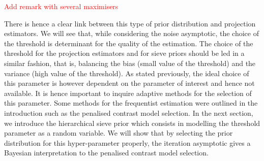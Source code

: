 \textcolor{red}{Add remark with several maximisers}

There is hence a clear link between this type of prior distribution and projection estimators.
We will see that, while considering the noise asymptotic, the choice of the threshold is determinant for the quality of the estimation.
The choice of the threshold for the projection estimators and for sieve priors should be led in a similar fashion, that is, balancing the bias (small value of the threshold) and the variance (high value of the threshold).
As stated previously, the ideal choice of this parameter is however dependent on the parameter of interest and hence not available.
It is hence important to inquire adaptive methods for the selection of this parameter.
Some methods for the frequentist estimation were outlined in the introduction such as the penalised contrast model selection.
In the next section, we introduce the hierarchical sieve prior which consists in modelling the threshold parameter as a random variable.
We will show that by selecting the prior distribution for this hyper-parameter properly, the iteration asymptotic gives a Bayesian interpretation to the penalised contrast model selection.
